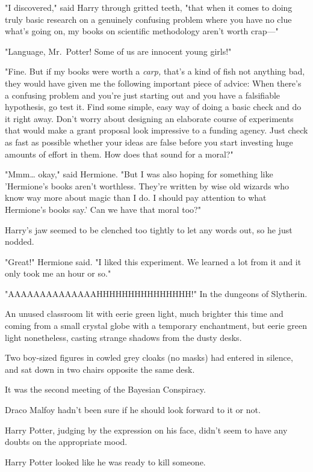 "I discovered," said Harry through gritted teeth, "that when it comes to doing 
truly basic research on a genuinely confusing problem where you have no clue 
what's going on, my books on scientific methodology aren't worth crap---"

"Language, Mr.~Potter! Some of us are innocent young girls!"

"Fine. But if my books were worth a \emph{carp,} that's a kind of fish not 
anything bad, they would have given me the following important piece of advice: 
When there's a confusing problem and you're just starting out and you have a 
falsifiable hypothesis, go test it. Find some simple, easy way of doing a basic 
check and do it right away. Don't worry about designing an elaborate course of 
experiments that would make a grant proposal look impressive to a funding 
agency. Just check as fast as possible whether your ideas are false before you 
start investing huge amounts of effort in them. How does that sound for a 
moral?"

"Mmm{\ldots} okay," said Hermione. "But I was also hoping for something like 
'Hermione's books aren't worthless. They're written by wise old wizards who 
know way more about magic than I do. I should pay attention to what Hermione's 
books say.' Can we have that moral too?"

Harry's jaw seemed to be clenched too tightly to let any words out, so he just 
nodded.

"Great!" Hermione said. "I liked this experiment. We learned a lot from it and 
it only took me an hour or so."

"AAAAAAAAAAAAAAHHHHHHHHHHHHHHH!"
\sbreak
In the dungeons of Slytherin.

An unused classroom lit with eerie green light, much brighter this time and 
coming from a small crystal globe with a temporary enchantment, but eerie green 
light nonetheless, casting strange shadows from the dusty desks.

Two boy-sized figures in cowled grey cloaks (no masks) had entered in silence, 
and sat down in two chairs opposite the same desk.

It was the second meeting of the Bayesian Conspiracy.

Draco Malfoy hadn't been sure if he should look forward to it or not.

Harry Potter, judging by the expression on his face, didn't seem to have any 
doubts on the appropriate mood.

Harry Potter looked like he was ready to kill someone.

